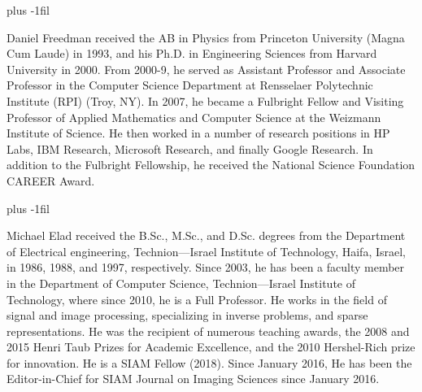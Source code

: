 \documentclass[10pt,twocolumn,twoside]{IEEEtran}
\begin{document}
\vskip -20pt plus -1fil

\begin{IEEEbiography}{Daniel Freedman}
received the AB in Physics from Princeton University (Magna Cum Laude) in 1993, and his Ph.D. in Engineering Sciences from Harvard University in 2000. From 2000-9, he served as Assistant Professor and Associate Professor in the Computer Science Department at Rensselaer Polytechnic Institute (RPI) (Troy, NY). In 2007, he became a Fulbright Fellow and Visiting Professor of Applied Mathematics and Computer Science at the Weizmann Institute of Science. He then worked in a number of research positions in HP Labs, IBM Research, Microsoft Research, and finally Google Research. In addition to the Fulbright Fellowship, he received the National Science Foundation CAREER Award.
\end{IEEEbiography}

\vskip -20pt plus -1fil

\begin{IEEEbiography}{Michael Elad}
received the B.Sc., M.Sc., and
D.Sc. degrees from the Department of Electrical engineering, Technion—Israel Institute of Technology,
Haifa, Israel, in 1986, 1988, and 1997, respectively.
Since 2003, he has been a faculty member in the
Department of Computer Science, Technion—Israel
Institute of Technology, where since 2010, he is a
Full Professor. He works in the field of signal and
image processing, specializing in inverse problems,
and sparse representations. He was the recipient of
numerous teaching awards, the 2008 and 2015 Henri
Taub Prizes for Academic Excellence, and the 2010 Hershel-Rich prize for innovation. He is a SIAM Fellow (2018). Since January 2016, He has been the
Editor-in-Chief for SIAM Journal on Imaging Sciences since January 2016.
\end{IEEEbiography}
\end{document}
